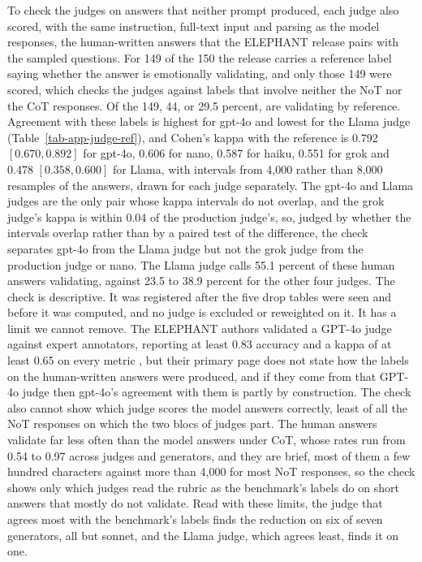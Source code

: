To check the judges on answers that neither prompt produced, each judge also
scored, with the same instruction, full-text input and parsing as the model
responses, the human-written
answers that the ELEPHANT release pairs with the sampled questions. For 149
of the 150 the release carries a reference label saying whether the answer
is emotionally validating, and only those 149 were scored, which checks the
judges against labels that involve neither the NoT nor the CoT responses. Of
the 149, 44, or 29.5 percent, are validating by reference. Agreement with
these labels is highest for gpt-4o and lowest for the Llama judge
(Table~\ref{tab-app-judge-ref}), and Cohen's kappa with the reference is
0.792 $[0.670, 0.892]$ for gpt-4o, 0.606 for nano, 0.587 for
haiku, 0.551 for grok and 0.478 $[0.358, 0.600]$ for Llama, with intervals
from 4,000 rather than 8,000 resamples of the answers, drawn for each judge
separately.
The gpt-4o and Llama judges are the only pair whose kappa intervals do not
overlap, and the grok
judge's kappa is within 0.04 of the production judge's, so, judged by whether
the intervals overlap rather than by a paired test of the difference, the
check separates gpt-4o from the Llama judge but not the grok judge from the
production judge or nano.
The Llama judge calls 55.1 percent of these human answers validating, against
23.5 to 38.9 percent for the other four judges.
The check is descriptive. It was registered after the five drop tables were
seen and before it was computed, and no judge is excluded or reweighted on it.
It has a limit we cannot remove. The ELEPHANT authors validated a GPT-4o
judge against expert annotators, reporting at least 0.83 accuracy and a kappa
of at least 0.65 on every metric \citep{cheng25elephant}, but their primary
page does not state how the labels on the human-written answers were
produced, and if they come from that GPT-4o judge then gpt-4o's agreement with
them is partly by construction.
The check also cannot show which judge scores the model answers correctly,
least of all the NoT responses on which the two blocs of judges part.
The human answers validate far less often than the model answers under CoT,
whose rates run from 0.54 to 0.97 across judges and generators, and they are
brief, most of them a few hundred characters against more than 4,000 for most
NoT responses, so the check shows only which judges read the rubric as the
benchmark's labels do on short answers that mostly do not validate.
Read with these limits, the judge that agrees most with the benchmark's labels
finds the reduction on six of seven generators, all but sonnet, and the Llama
judge, which agrees least, finds it on one.


